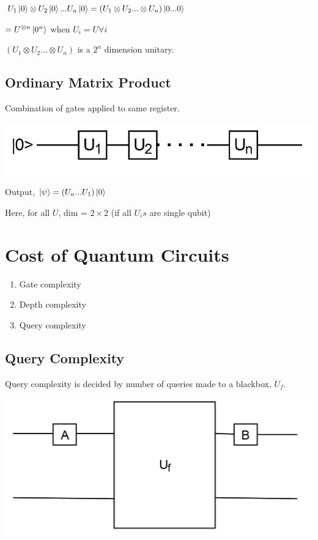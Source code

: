 \documentclass{article}
\begin{document}
\begin{center}
$    U_{1} \ket{0} \otimes U_{2} \ket{0} ... U_{n} \ket{0}
    = (U_{1} \otimes U_{2} ... \otimes U_{n}) \ket{0...0}$


    $= U^{\otimes n} \ket{0^{n}}$ when $U_{i}=U \forall i$
    
\end{center}

$(U_{1} \otimes U_{2} ... \otimes U_{n}) $ is a $2^{n}$ dimension unitary.

\subsection{Ordinary Matrix Product}
Combination of gates applied to same register.

\includegraphics[scale=0.5]{q2.png}

Output, $\ket{\psi} = (U_{n}...U_{1})\ket{0}$

Here, for all $U$, dim = $2 \times 2 $ (if all $U_{i}s$ are single qubit)

\section{Cost of Quantum Circuits}

\begin{enumerate}
    \item Gate complexity
    \item Depth complexity 
    \item Query complexity
\end{enumerate}
\subsection{Query Complexity}
Query complexity is decided by number of queries made to a blackbox, $U_{f}$.

\includegraphics[scale=0.5]{q3.png}
\end{document}
